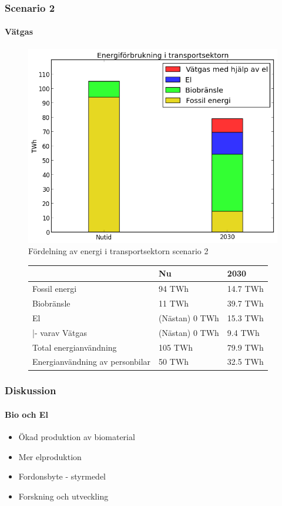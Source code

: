 \documentclass{beamer}
\begin{document}
\begin{frame}
	\frametitle{Scenario 2}
	\framesubtitle{Vätgas}
		\begin{figure}[h!]
	       \centering
	       \includegraphics[scale=0.7]{scen2transport.png}
	       \caption{Fördelning av energi i transportsektorn scenario 2}
	       \label{fig:scen2transport}
		\end{figure}

		\begin{figure}[h!]
			\centering
			\label{tab:scen2energi}
			\begin{tabular}{ | l | l | l | }
			\hline
								& Nu		& 2030 \\ \hline
			Fossil energi				& 94 TWh	& 14.7 TWh \\ \hline
			Biobränsle				& 11 TWh	& 39.7 TWh \\ \hline %
			El					& (Nästan) 0 TWh &  15.3 TWh \\ \hline %
			|- varav Vätgas     & (Nästan) 0 TWh & 9.4 TWh\\ \hline
			Total energianvändning		& 105 TWh	& 79.9 TWh \\ \hline
			Energianvändning av personbilar	& 50 TWh	& 32.5 TWh \\ \hline
			\end{tabular}
		\end{figure}
\end{frame}

\begin{frame}
	\frametitle{Diskussion}
	\framesubtitle{Bio och El}
	\begin{itemize}
		\item Ökad produktion av biomaterial
		\item Mer elproduktion
		\item Fordonsbyte - styrmedel
		\item Forskning och utveckling
	\end{itemize}
\end{frame}
\end{document}

